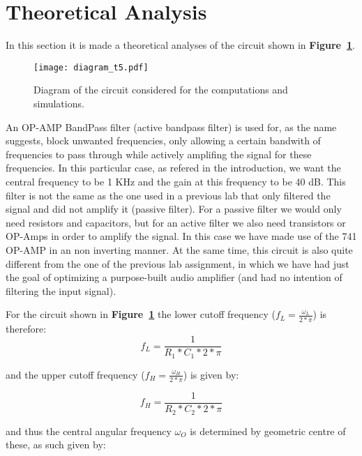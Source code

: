 \section{Theoretical Analysis}
\label{sec:analysis}

In this section it is made a theoretical analyses of the circuit shown in \textbf{Figure~\ref{fig:diagram_t5}}.
\begin{figure}[h] \centering
\texttt{[image: diagram\_t5.pdf]}
\caption{Diagram of the circuit considered for the computations and simulations.}
\label{fig:diagram_t5}
\end{figure}


An OP-AMP BandPass filter (active bandpass filter) is used for, as the name suggests, block unwanted frequencies, only allowing a certain bandwith of frequencies to pass through while actively amplifing the signal for these frequencies. In this particular case, as refered in the introduction, we want the central frequency to be 1 KHz and the gain at this frequency to be 40 dB. This filter is not the same as the one used in a previous lab that only filtered the signal and did not amplify it (passive filter). For a passive filter we would only need resistors and capacitors, but for an active filter we also need transistors or OP-Amps in order to amplify the signal. In this case we have made use of the 741 OP-AMP in an non inverting manner. At the same time, this circuit is also quite different from the one of the previous lab assignment, in which we have had just the goal of optimizing a purpose-built audio amplifier (and had no intention of filtering the input signal).\par 


For the circuit shown in \textbf{Figure~\ref{fig:diagram_t5}} the lower cutoff frequency ($f_L = \frac{\omega_L}{2*\pi}$) is therefore:
\begin {equation}
	f_L= \frac{1}{R_1*C_1*2*\pi}   
	\label{eq:lcf}
\end{equation}


and the upper cutoff frequency ($f_H = \frac{\omega_H}{2*\pi}$) is given by: 

\begin {equation}
	f_H = \frac{1}{R_2 *C_2* 2*\pi}  
	\label{eq:ucf}
\end{equation}

and thus the central angular frequency $\omega_O$ is determined by geometric centre of these, as such given by:

